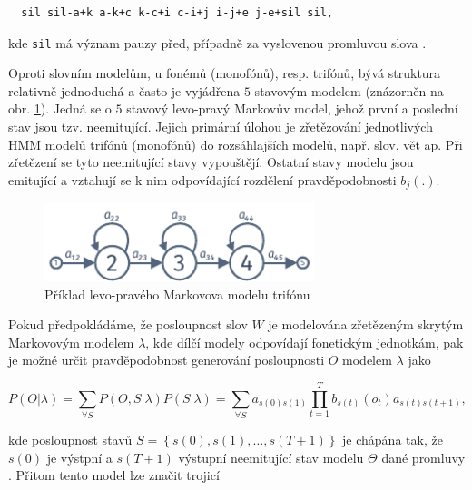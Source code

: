 \begin{verbatim}
  sil sil-a+k a-k+c k-c+i c-i+j i-j+e j-e+sil sil,
\end{verbatim}

\noindent kde \texttt{sil} má význam pauzy před, případně za vyslovenou promluvou slova .

Oproti slovním modelům, u fonémů (monofónů), resp. trifónů, bývá struktura relativně jednoduchá a často je vyjádřena $5$ stavovým modelem (znázorněn na obr. \ref{fig:asr:acoustic:hmm}). Jedná se o $5$ stavový levo-pravý Markovův model, jehož první a poslední stav jsou tzv. neemitující. Jejich primární úlohou je zřetězování jednotlivých HMM modelů trifónů (monofónů) do rozsáhlajších modelů, např. slov, vět ap. Při zřetězení se tyto neemitující stavy vypouštějí. Ostatní stavy modelu jsou emitující a vztahují se k nim odpovídající rozdělení pravděpodobnosti $b_j(.)$.

\begin{figure}[hbpt]
  \centering
  \includegraphics[width=0.7\textwidth]{./ch4-asr/img/hmm_structure.pdf}
  \caption{Příklad levo-pravého Markovova modelu trifónu}
  \label{fig:asr:acoustic:hmm}
\end{figure}

Pokud předpokládáme, že posloupnost slov $W$ je modelována zřetězeným skrytým Markovovým modelem $\lambda$, kde dílčí modely odpovídají fonetickým jednotkám, pak je možné určit pravděpodobnost generování posloupnosti $O$ modelem $\lambda$ jako

\begin{equation}
  P\left(O|\lambda\right) = \sum_{\forall S} P\left(O, S| \lambda\right)P\left(S|\lambda\right) = \sum_{\forall S} a_{s\left(0\right)s\left(1\right)} \prod_{t=1}^{T} b_{s\left(t\right)}\left(o_t\right)a_{s\left(t\right)s\left(t+1\right)},
  \label{eq:asr:acoustic:structure:output}
\end{equation}

\noindent kde posloupnost stavů $S = \left\{s\left(0\right), s\left(1\right),\dots, s\left(T+1\right)\right\}$ je chápána tak, že $s\left(0\right)$ je výstpní a $s\left(T+1\right)$ výstupní neemitující stav modelu $\Theta$ dané promluvy \cite{Psutka2006}. Přitom tento model lze značit trojicí

